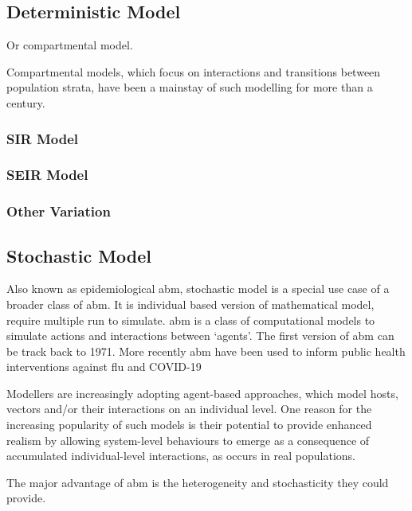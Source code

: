 \documentclass[a4paper, 12pt, twoside]{article}
\begin{document}
\subsection{Deterministic Model}

Or compartmental model.

Compartmental models, which focus on interactions and transitions between population strata, have been a mainstay of such modelling for more than a century.


\subsubsection{SIR Model}

\subsubsection{SEIR Model}

\subsubsection{Other Variation}

\subsection{Stochastic Model}

Also known as epidemiological \gls{abm}, stochastic model is a special use case of a broader class of \gls{abm}.
It is individual based version of mathematical model, require multiple run to simulate.
\gls{abm} is a class of computational models to simulate actions and interactions between `agents'.
The first version of \gls{abm} can be track back to 1971\cite{Schelling1971}.
More recently \gls{abm} have been used to inform public health interventions against flu\cite{Ferguson2006a, Ferguson2005} and COVID-19\cite{Maziarz2020, Ferguson2020, Chang2020}

Modellers are increasingly adopting agent-based approaches, which model hosts, vectors and/or their interactions on an individual level.
One reason for the increasing popularity of such models is their potential to provide enhanced realism by allowing system-level behaviours to emerge as a consequence of accumulated individual-level interactions, as occurs in real populations.

The major advantage of \gls{abm} is the heterogeneity and stochasticity they could provide.
\end{document}
